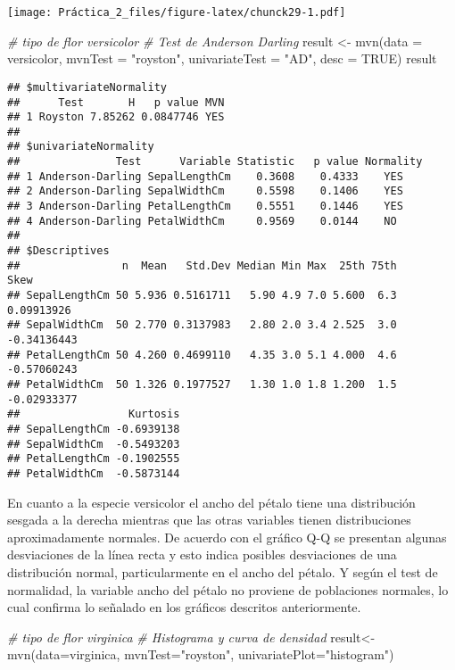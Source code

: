 \documentclass[
]{article}
\newenvironment{Shaded}{\begin{snugshade}}{\end{snugshade}}
\newcommand{\AttributeTok}[1]{\textcolor[rgb]{0.77,0.63,0.00}{#1}}
\newcommand{\CommentTok}[1]{\textcolor[rgb]{0.56,0.35,0.01}{\textit{#1}}}
\newcommand{\ConstantTok}[1]{\textcolor[rgb]{0.00,0.00,0.00}{#1}}
\newcommand{\FunctionTok}[1]{\textcolor[rgb]{0.00,0.00,0.00}{#1}}
\newcommand{\NormalTok}[1]{#1}
\newcommand{\OtherTok}[1]{\textcolor[rgb]{0.56,0.35,0.01}{#1}}
\newcommand{\StringTok}[1]{\textcolor[rgb]{0.31,0.60,0.02}{#1}}
\begin{document}
\texttt{[image: Práctica\_2\_files/figure-latex/chunck29-1.pdf]}

\begin{Shaded}
\begin{Highlighting}[]
\CommentTok{\# tipo de flor versicolor}
\CommentTok{\# Test de Anderson Darling}
\NormalTok{result }\OtherTok{\textless{}{-}} \FunctionTok{mvn}\NormalTok{(}\AttributeTok{data =}\NormalTok{ versicolor, }\AttributeTok{mvnTest =} \StringTok{"royston"}\NormalTok{, }\AttributeTok{univariateTest =} \StringTok{"AD"}\NormalTok{, }\AttributeTok{desc =} \ConstantTok{TRUE}\NormalTok{)}
\NormalTok{result}
\end{Highlighting}
\end{Shaded}

\begin{verbatim}
## $multivariateNormality
##      Test       H   p value MVN
## 1 Royston 7.85262 0.0847746 YES
## 
## $univariateNormality
##               Test      Variable Statistic   p value Normality
## 1 Anderson-Darling SepalLengthCm    0.3608    0.4333    YES   
## 2 Anderson-Darling SepalWidthCm     0.5598    0.1406    YES   
## 3 Anderson-Darling PetalLengthCm    0.5551    0.1446    YES   
## 4 Anderson-Darling PetalWidthCm     0.9569    0.0144    NO    
## 
## $Descriptives
##                n  Mean   Std.Dev Median Min Max  25th 75th        Skew
## SepalLengthCm 50 5.936 0.5161711   5.90 4.9 7.0 5.600  6.3  0.09913926
## SepalWidthCm  50 2.770 0.3137983   2.80 2.0 3.4 2.525  3.0 -0.34136443
## PetalLengthCm 50 4.260 0.4699110   4.35 3.0 5.1 4.000  4.6 -0.57060243
## PetalWidthCm  50 1.326 0.1977527   1.30 1.0 1.8 1.200  1.5 -0.02933377
##                 Kurtosis
## SepalLengthCm -0.6939138
## SepalWidthCm  -0.5493203
## PetalLengthCm -0.1902555
## PetalWidthCm  -0.5873144
\end{verbatim}

En cuanto a la especie versicolor el ancho del pétalo tiene una
distribución sesgada a la derecha mientras que las otras variables
tienen distribuciones aproximadamente normales. De acuerdo con el
gráfico Q-Q se presentan algunas desviaciones de la línea recta y esto
indica posibles desviaciones de una distribución normal, particularmente
en el ancho del pétalo. Y según el test de normalidad, la variable ancho
del pétalo no proviene de poblaciones normales, lo cual confirma lo
señalado en los gráficos descritos anteriormente.

\begin{Shaded}
\begin{Highlighting}[]
\CommentTok{\# tipo de flor virginica}
\CommentTok{\# Histograma y curva de densidad}
\NormalTok{result}\OtherTok{\textless{}{-}} \FunctionTok{mvn}\NormalTok{(}\AttributeTok{data=}\NormalTok{virginica, }\AttributeTok{mvnTest=}\StringTok{"royston"}\NormalTok{, }\AttributeTok{univariatePlot=}\StringTok{"histogram"}\NormalTok{)}
\end{Highlighting}
\end{Shaded}
\end{document}

